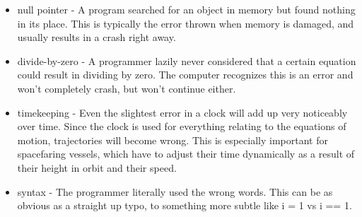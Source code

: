 \documentclass[a4paper]{article}
\begin{document}
\begin{minipage}[t]{0.5\linewidth}
\begin{itemize}[leftmargin=0.5cm]
\item null pointer - A program searched for an object in memory but found nothing in its place. This is typically the error thrown when memory is damaged, and usually results in a crash right away.
\item divide-by-zero - A programmer lazily never considered that a certain equation could result in dividing by zero. The computer recognizes this is an error and won't completely crash, but won't continue either.
\item timekeeping - Even the slightest error in a clock will add up very noticeably over time. Since the clock is used for everything relating to the equations of motion, trajectories will become wrong. This is especially important for spacefaring vessels, which have to adjust their time dynamically as a result of their height in orbit and their speed. 
\item syntax - The programmer literally used the wrong words. This can be as obvious as a straight up typo, to something more subtle like i = 1 vs i == 1.
\end{itemize}
\end{minipage}
\end{document}
